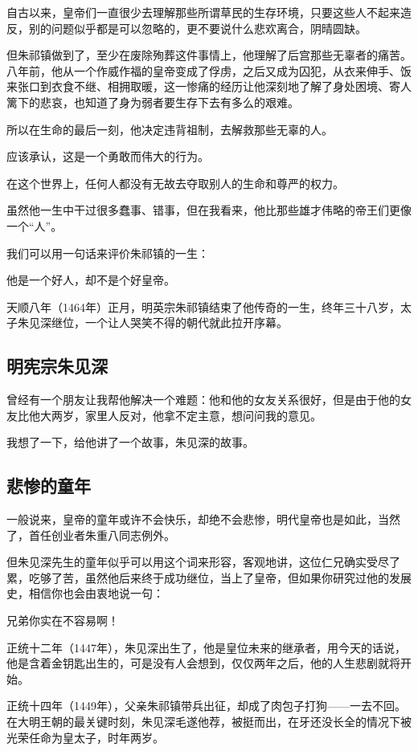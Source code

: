\begin{multicols}{\theparacolNo}
自古以来，皇帝们一直很少去理解那些所谓草民的生存环境，只要这些人不起来造反，别的问题似乎都是可以忽略的，更不要说什么悲欢离合，阴晴圆缺。

但朱祁镇做到了，至少在废除殉葬这件事情上，他理解了后宫那些无辜者的痛苦。八年前，他从一个作威作福的皇帝变成了俘虏，之后又成为囚犯，从衣来伸手、饭来张口到衣食不继、相拥取暖，这一惨痛的经历让他深刻地了解了身处困境、寄人篱下的悲哀，也知道了身为弱者要生存下去有多么的艰难。

所以在生命的最后一刻，他决定违背祖制，去解救那些无辜的人。

应该承认，这是一个勇敢而伟大的行为。

在这个世界上，任何人都没有无故去夺取别人的生命和尊严的权力。

虽然他一生中干过很多蠢事、错事，但在我看来，他比那些雄才伟略的帝王们更像一个“人”。

我们可以用一句话来评价朱祁镇的一生：

他是一个好人，却不是个好皇帝。

天顺八年（1464年）正月，明英宗朱祁镇结束了他传奇的一生，终年三十八岁，太子朱见深继位，一个让人哭笑不得的朝代就此拉开序幕。

\subsection{明宪宗朱见深}
曾经有一个朋友让我帮他解决一个难题：他和他的女友关系很好，但是由于他的女友比他大两岁，家里人反对，他拿不定主意，想问问我的意见。

我想了一下，给他讲了一个故事，朱见深的故事。

\subsection{悲惨的童年}
一般说来，皇帝的童年或许不会快乐，却绝不会悲惨，明代皇帝也是如此，当然了，首任创业者朱重八同志例外。

但朱见深先生的童年似乎可以用这个词来形容，客观地讲，这位仁兄确实受尽了累，吃够了苦，虽然他后来终于成功继位，当上了皇帝，但如果你研究过他的发展史，相信你也会由衷地说一句：

兄弟你实在不容易啊！

正统十二年（1447年），朱见深出生了，他是皇位未来的继承者，用今天的话说，他是含着金钥匙出生的，可是没有人会想到，仅仅两年之后，他的人生悲剧就将开始。

正统十四年（1449年），父亲朱祁镇带兵出征，却成了肉包子打狗——一去不回。在大明王朝的最关键时刻，朱见深毛遂他荐，被挺而出，在牙还没长全的情况下被光荣任命为皇太子，时年两岁。


\end{multicols}
